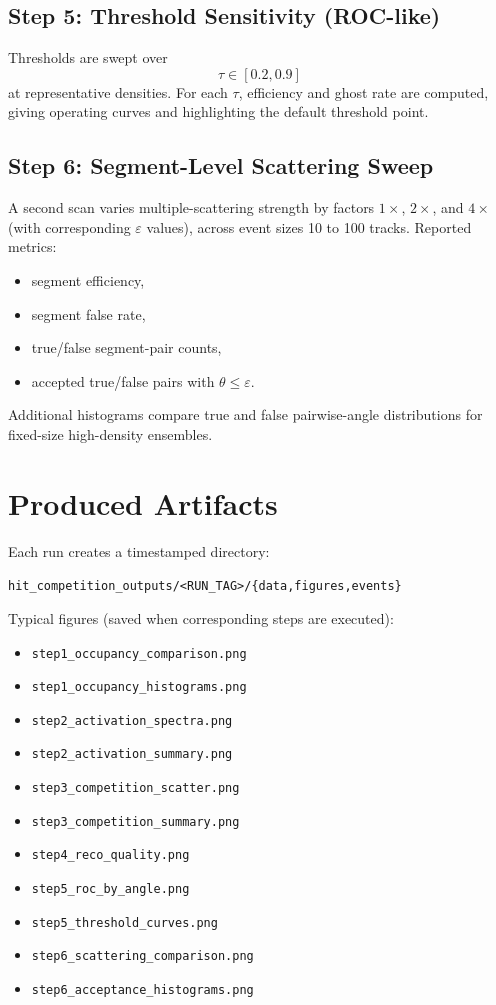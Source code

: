 \documentclass[11pt,a4paper]{article}
\begin{document}
\subsection{Step 5: Threshold Sensitivity (ROC-like)}
Thresholds are swept over
\[
\tau\in[0.2,0.9]
\]
at representative densities. For each $\tau$, efficiency and ghost rate are
computed, giving operating curves and highlighting the default threshold point.

\subsection{Step 6: Segment-Level Scattering Sweep}
A second scan varies multiple-scattering strength by factors
$1\times$, $2\times$, and $4\times$ (with corresponding $\varepsilon$ values),
across event sizes 10 to 100 tracks. Reported metrics:
\begin{itemize}[leftmargin=1.5em]
  \item segment efficiency,
  \item segment false rate,
  \item true/false segment-pair counts,
  \item accepted true/false pairs with $\theta\le\varepsilon$.
\end{itemize}
Additional histograms compare true and false pairwise-angle distributions for
fixed-size high-density ensembles.

\section{Produced Artifacts}
Each run creates a timestamped directory:
\begin{center}
\texttt{hit\_competition\_outputs/<RUN\_TAG>/\{data,figures,events\}}
\end{center}
Typical figures (saved when corresponding steps are executed):
\begin{itemize}[leftmargin=1.5em]
  \item \texttt{step1\_occupancy\_comparison.png}
  \item \texttt{step1\_occupancy\_histograms.png}
  \item \texttt{step2\_activation\_spectra.png}
  \item \texttt{step2\_activation\_summary.png}
  \item \texttt{step3\_competition\_scatter.png}
  \item \texttt{step3\_competition\_summary.png}
  \item \texttt{step4\_reco\_quality.png}
  \item \texttt{step5\_roc\_by\_angle.png}
  \item \texttt{step5\_threshold\_curves.png}
  \item \texttt{step6\_scattering\_comparison.png}
  \item \texttt{step6\_acceptance\_histograms.png}
\end{itemize}
\end{document}
